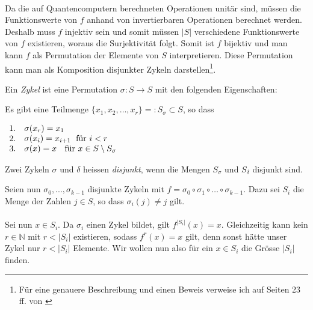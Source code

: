 \paragraph{}
Da die auf Quantencomputern berechneten Operationen unitär sind, müssen die Funktionswerte von $f$ anhand von invertierbaren Operationen berechnet werden. Deshalb muss $f$ injektiv sein und somit müssen $|S|$ verschiedene Funktionswerte von $f$ existieren, woraus die Surjektivität folgt. Somit ist $f$ bijektiv und man kann $f$ als Permutation der Elemente von $S$ interpretieren. Diese Permutation kann man als Komposition disjunkter Zykeln darstellen\footnote{Für eine genauere Beschreibung und einen Beweis verweise ich auf Seiten 23 ff. von \cite{perm}}.

\vspace{0.1cm}
\hspace{0.8cm}\begin{minipage}[t]{13.3cm}

Ein \emph{Zykel} ist eine Permutation $\sigma : S\rightarrow S$ mit den folgenden Eigenschaften:

\vspace{0.1cm}
Es gibt eine Teilmenge $\{x_1, x_2, \ldots, x_r\}=:S_\sigma \subset S $, so dass

\vspace{0.1cm}
$\begin{array}{ll}

1. & \sigma (x_r)=x_1 \\

2. & \sigma (x_i)=x_{i+1} \text{ \;für $i<r$}  \\

3. & \sigma (x)=x \text{ \; für $x\in S\setminus S_\sigma$}

\end{array}$

\vspace{0.1cm}
Zwei Zykeln $\sigma$ und $\delta$ heissen \emph{disjunkt}, wenn die Mengen $S_\sigma$ und $S_\delta$ disjunkt sind.

\end{minipage}


\vspace{0.2cm}
Seien nun $\sigma_0, ..., \sigma_{k - 1}$ disjunkte Zykeln mit $f=\sigma_0\circ\sigma_1\circ \ldots\circ \sigma_{k - 1}$. Dazu sei $S_i$ die Menge der Zahlen $j \in S$, so dass $\sigma_i(j) \neq j$ gilt.
\paragraph{}
Sei nun $x \in S_i$. Da $\sigma_i$ einen Zykel bildet, gilt $f^{|S_i|}(x) = x$. Gleichzeitig kann kein $r \in \mathbb{N}$ mit $r < |S_i|$ existieren, sodass $f^r(x) = x$ gilt, denn sonst hätte unser Zykel nur $r < |S_i|$ Elemente. Wir wollen nun also für ein $x \in S_i$ die Grösse $|S_i|$ finden.

